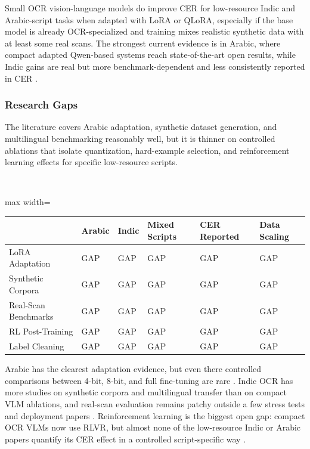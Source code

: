     
    Small OCR vision-language models do improve CER for low-resource Indic and Arabic-script tasks when adapted with LoRA or QLoRA, especially if the base model is already OCR-specialized and training mixes realistic synthetic data with at least some real scans. The strongest current evidence is in Arabic, where compact adapted Qwen-based systems reach state-of-the-art open results, while Indic gains are real but more benchmark-dependent and less consistently reported in CER  \cite{Wasfy2025QARI-OCR:} \cite{Hennara2025Baseer:} \cite{Faraz2026Designing} \cite{Singh2026Can}.
    
    
    \subsubsection*{Research Gaps}
    
    
    The literature covers Arabic adaptation, synthetic dataset generation, and multilingual benchmarking reasonably well, but it is thinner on controlled ablations that isolate quantization, hard-example selection, and reinforcement learning effects for specific low-resource scripts.
    
    
    \mbox{}\\
    \begin{adjustbox}{max width=\textwidth}
    \begin{tabular}{p{2.7cm} | p{2.7cm} | p{2.7cm} | p{2.7cm} | p{2.7cm} | p{2.7cm}}
    \hline
     & Arabic & Indic & Mixed Scripts & CER Reported & Data Scaling \\
    \hline
    LoRA Adaptation & GAP & GAP & GAP & GAP & GAP \\
    Synthetic Corpora & GAP & GAP & GAP & GAP & GAP \\
    Real-Scan Benchmarks & GAP & GAP & GAP & GAP & GAP \\
    RL Post-Training & GAP & GAP & GAP & GAP & GAP \\
    Label Cleaning & GAP & GAP & GAP & GAP & GAP \\
    \hline
    \end{tabular}
    \end{adjustbox}
    
    
    Arabic has the clearest adaptation evidence, but even there controlled comparisons between 4-bit, 8-bit, and full fine-tuning are rare  \cite{Elkousy2026Domain-Specific} \cite{Momayiz2026AtlasOCR:}. Indic OCR has more studies on synthetic corpora and multilingual transfer than on compact VLM ablations, and real-scan evaluation remains patchy outside a few stress tests and deployment papers  \cite{Achyuth2026What} \cite{Singh2026Can} \cite{Faraz2026Designing}. Reinforcement learning is the biggest open gap: compact OCR VLMs now use RLVR, but almost none of the low-resource Indic or Arabic papers quantify its CER effect in a controlled script-specific way  \cite{Taghadouini2026LightOnOCR:}.
    
